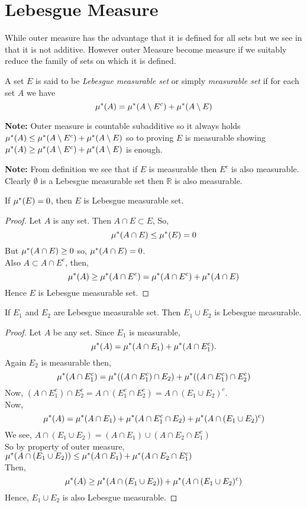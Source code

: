 \section{Lebesgue Measure}

While outer measure has the advantage that it is defined for all sets but we see in  that it is not additive.
However outer Measure become measure if we suitably reduce the family of sets on which it is defined.
\begin{definition}
    A set $E$ is said to be  \textit{Lebesgue measurable set} or simply  \textit{measurable set} if for each set $A$ we have 
    \[
        \mu^{*}(A)=\mu^{*}(A\setminus E^{c})+\mu^{*}(A\setminus E)
    \]
\end{definition}

\textbf{Note:} Outer measure is countable subadditive so it always holds $\mu^{*}(A)\le \mu^{*}(A\setminus E^{c})+\mu^{*}(A\setminus E)$ so to proving $E$ is measurable showing 
$\mu^{*}(A)\ge \mu^{*}(A\setminus E^{c})+\mu^{*}(A\setminus E)$ is enough. 

\textbf{Note:} From definition we see that if $E$ is measurable then  $E^{c}$ is also measurable. Clearly $\emptyset$ is a Lebesgue measurable set then $\mathds{R}$ is also measurable.

\begin{theorem}
    \label{measure0}
    If $\mu^{*}(E)=0$, then  $E$ is Lebesgue measurable set.
\end{theorem}
\begin{proof}
    Let $A$ is any set. Then  $A\cap E\subset E$, So,
    \[
        \mu^{*}(A\cap E)\le \mu^{*}(E)=0
    \]
    But $\mu^{*}(A\cap E)\ge 0$ so, $\mu^{*}(A\cap E)=0$.\\
    Also $A\subset A\cap E^{c}$, then,
    \[
        \mu^{*}(A)\ge \mu^{*}(A\cap E^{c})=\mu^{*}(A\cap E^{c})+\mu^{*}(A\cap E)
    \]
    Hence $E$ is Lebesgue measurable set.
\end{proof}

\begin{theorem}[]
    \label{union is measurable}
    If $E_1$ and $E_2$ are Lebesgue measurable set. Then  $E_1\cup E_2$ is Lebesgue measurable.
\end{theorem}
\begin{proof}
    Let $A$ be any set. Since  $E_1$ is measurable,
    \[
        \mu^{*}(A)=\mu^{*}(A\cap E_1)+\mu^{*}(A\cap E_1^{c}).
    \]
    Again $E_2$ is measurable then,
    \[
        \mu^{*}(A\cap E_1^{c})=\mu^{*}((A\cap E_1^{c})\cap E_2)+\mu^{*}((A\cap E_1^{c})\cap E_2^{c})
    \]
    Now, $(A\cap E_1^{c})\cap E_2^{c}=A\cap(E_1^{c}\cap E_2^{c})=A\cap(E_1\cup E_2)^{c}$.
    \\Now,
    \[
        \mu^{*}(A)=\mu^{*}(A\cap E_1)+\mu^{*}(A\cap E_1^{c}\cap E_2)+\mu^{*}(A\cap (E_1\cup E_2)^{c})
    \]
    We see, $A\cap(E_1\cup E_2)=(A\cap E_1)\cup(A\cap E_2\cap E_1^{c})$ 
    \\So by property of outer measure, $\mu^{*}(A\cap(E_1\cup E_2))\le \mu^{*}(A\cap E_1)+\mu^{*}(A\cap E_2\cap E_1^{c})$\\
    Then,
    \[
        \mu^{*}(A)\ge \mu^{*}(A\cap(E_1\cup E_2))+\mu^{*}(A\cap (E_1\cup E_2)^{c})
    \]
    Hence, $E_1\cup E_2$ is also Lebesgue measurable.
\end{proof}

